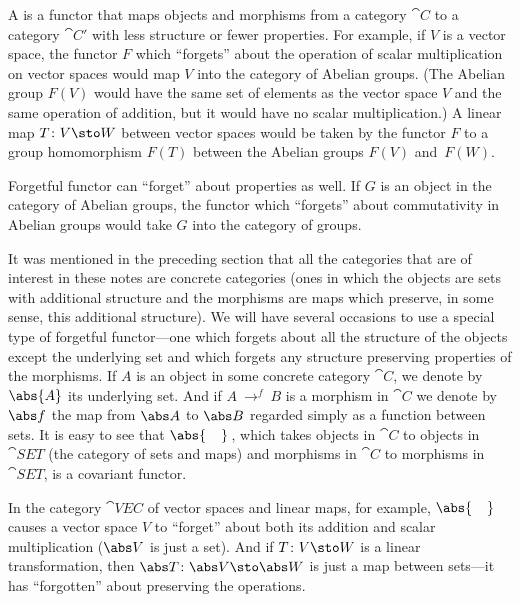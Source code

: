 \begin{exam}\label{functors005exam} A
 is a functor that maps objects and morphisms from a category $\cat
C$ to a category $\cat C'$ with less structure or fewer properties.  For example, if $V$
is a vector space, the functor $F$ which ``forgets'' about the operation of scalar
multiplication on vector spaces would map $V$ into the category of Abelian groups. (The
Abelian group $F(V)$ would have the same set of elements as the vector space $V$ and the
same operation of addition, but it would have no scalar multiplication.)  A linear map
$T\colon V \sto W$ between vector spaces would be taken by the functor $F$ to a group
homomorphism $F(T)$ between the Abelian groups $F(V)$ and~$F(W)$.

Forgetful functor can ``forget'' about properties as well.  If $G$ is an object in the
category of Abelian groups, the functor which ``forgets'' about commutativity in Abelian
groups would take $G$ into the category of groups.

It was mentioned in the preceding section that all the categories that are of interest in
these notes are concrete categories (ones in which the objects are sets with additional
structure and the morphisms are maps which preserve, in some sense, this additional
structure). We will have several occasions to use a special type of forgetful
functor---one which forgets about all the structure of the objects except the underlying
set and which forgets any structure preserving properties of the morphisms. If $A$ is an
object in some concrete category $\cat C$, we denote by
$\abs{A}$ its underlying set. And if \mbox{$A~\to^f~B$} is a morphism in $\cat C$ we
denote by $\abs f$ the map from $\abs A$ to $\abs B$ regarded simply as a function
between sets.  It is easy to see that $\abs{\hphantom{M}}$\,, which takes objects in
$\cat C$ to objects in $\cat{SET}$ (the category of sets and maps) and morphisms in $\cat
C$ to morphisms in $\cat{SET}$, is a covariant functor.

In the category $\cat{VEC}$ of vector spaces and linear maps, for example,
$\abs{\hphantom{M}}$ causes a vector space $V$ to ``forget'' about both its addition and
scalar multiplication ($\abs V$ is just a set). And if $T\colon V \sto W$ is a linear
transformation, then $\abs T\colon \abs V \sto \abs W$ is just a map between sets---it
has ``forgotten'' about preserving the operations.
\end{exam}



